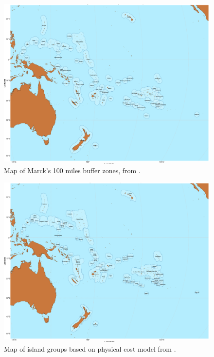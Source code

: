\documentclass[unnumsec,webpdf,modern,medium]{oup-authoring-template}
\begin{document}
\begin{figure}
\centering
\includegraphics[width=\textwidth]{SBZR_buffer.png}
\caption{Map of Marck's 100 miles buffer zones, from \citet{NZSA_overnight_2023}.}
\label{appendix_SBZR_buffer}
\end{figure}


\begin{figure}
\centering
\includegraphics[width=\textwidth]{SBZR_cost.png}
\caption{Map of island groups based on physical cost model from \citet{NZSA_overnight_2023}.}
\label{appendix_SBZR_cost}
\end{figure}
\end{document}

